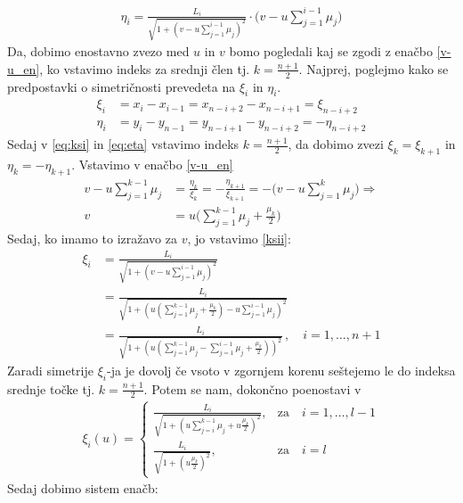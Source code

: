 \documentclass[a4paper,12pt]{article}
\begin{document}
\begin{align}
    \eta_i = \frac{L_i}{\sqrt{1 + (v - u \sum_{j=1}^{i-1}\mu_j)^2}}\cdot \Big(v - u \sum_{j=1}^{i-1}\mu_j\Big) 
\end{align}
Da, dobimo enostavno zvezo med $u$ in $v$ bomo pogledali kaj se zgodi z enačbo
\ref{v-u_en}, ko vstavimo indeks za srednji člen tj. $k = \frac{n+1}{2}$.
Najprej, poglejmo kako se predpostavki o simetričnosti prevedeta na $\xi_i$ in $\eta_i$.
\begin{align}
    \xi_i &= x_i - x_{i-1} = x_{n-i+2} - x_{n-i+1} = \xi_{n-i+2} \label{eq:ksi}\\
    \eta_i &= y_i - y_{n-1} = y_{n-i+1} - y_{n-i+2} = - \eta_{n-i+2}
    \label{eq:eta}
\end{align}
Sedaj v \ref{eq:ksi} in \ref{eq:eta} vstavimo indeks $k = \frac{n+1}{2}$, da dobimo zvezi $\xi_k = \xi_{k+1}$ in $\eta_k = - \eta_{k+1}$. Vstavimo v enačbo
\ref{v-u_en}
\begin{align*}
    v - u \sum_{j=1}^{k-1}\mu_j &= \frac{\eta_k}{\xi_k} = - \frac{\eta_{k+1}}{\xi_{k+1}} = - \Big(v - u \sum_{j=1}^{k}\mu_j\Big) \Rightarrow \\
    v &= u\Big( \sum_{j=1}^{k-1}\mu_j + \frac{\mu_k}{2} \Big)
\end{align*}
Sedaj, ko imamo to izražavo za $v$, jo vstavimo \ref{ksii}:
\begin{align*}
    \xi_i &= \frac{L_i}{\sqrt{1 + (v - u \sum_{j=1}^{i-1}\mu_j)^2}} \\
            &= \frac{L_i}{\sqrt{1 + (u (\sum_{j=1}^{k-1}\mu_j + \frac{\mu_k}{2})- u \sum_{j=1}^{i-1}\mu_j)^2}} \\
            &= \frac{L_i}{\sqrt{1 + (u(\sum_{j=1}^{k-1}\mu_j - \sum_{j=1}^{i-1}\mu_j + \frac{\mu_k}{2}))^2}} \, , \quad  i = 1,\dots,n+1
\end{align*}
Zaradi simetrije $\xi_i$-ja je dovolj če vsoto v zgornjem korenu seštejemo le do 
indeksa srednje točke tj. $k = \frac{n+1}{2}$. Potem se nam, dokončno poenostavi v 
\begin{align*}
    \xi_i(u) =  
    \begin{cases}
        \frac{L_i}{\sqrt{1 + (u\sum_{j=i}^{k-1}\mu_j + u\frac{\mu_k}{2})^2}}, &\text{za} \quad i = 1,\dots,l-1 \\
        \frac{L_i}{\sqrt{1 + (u\frac{\mu_k}{2})^2}}, &\text{za} \quad i = l
    \end{cases} 
\end{align*}
Sedaj dobimo sistem enačb:
\end{document}
